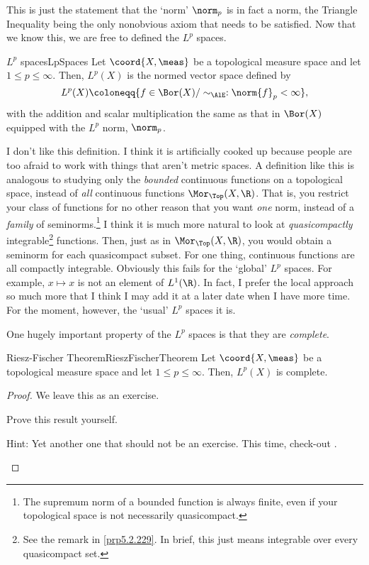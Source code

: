 This is just the statement that the `norm' $\norm _p$ is in fact a norm, the Triangle Inequality being the only nonobvious axiom that needs to be satisfied.  Now that we know this, we are free to defined the $L^p$ spaces.
\begin{dfn}{$L^p$ spaces}{LpSpaces}
Let $\coord{X,\meas}$ be a topological measure space and let $1\leq p\leq \infty$.  Then, $L^p(X)$ is the normed vector space defined by
\begin{equation}
L^p(X)\coloneqq \{ f\in \Bor (X)/\sim _{\AlE}:\norm{f}_p<\infty \} ,
\end{equation}
with the addition and scalar multiplication the same as that in $\Bor (X)$ equipped with the $L^p$ norm, $\norm _p$.
\begin{rmk}
I don't like this definition.  I think it is artificially cooked up because people are too afraid to work with things that aren't metric spaces.  A definition like this is analogous to studying only the \emph{bounded} continuous functions on a topological space, instead of \emph{all} continuous functions $\Mor _{\Top}(X,\R )$.  That is, you restrict your class of functions for no other reason that you want \emph{one} norm, instead of a \emph{family} of seminorms.\footnote{The supremum norm of a bounded function is always finite, even if your topological space is not necessarily quasicompact.}  I think it is much more natural to look at \emph{quasicompactly} integrable\footnote{See the remark in \cref{prp5.2.229}.  In brief, this just means integrable over every quasicompact set.} functions.  Then, just as in $\Mor _{\Top}(X,\R )$, you would obtain a seminorm for each quasicompact subset.  For one thing, continuous functions are all compactly integrable.  Obviously this fails for the `global' $L^p$ spaces.  For example, $x\mapsto x$ is not an element of $L^1(\R )$.  In fact, I prefer the local approach so much more that I think I may add it at a later date when I have more time.  For the moment, however, the `usual' $L^p$ spaces it is.
\end{rmk}
\end{dfn}
One hugely important property of the $L^p$ spaces is that they are \emph{complete}.
\begin{thm}{Riesz-Fischer Theorem}{RieszFischerTheorem}
Let $\coord{X,\meas}$ be a topological measure space and let $1\leq p\leq \infty$.  Then, $L^p(X)$ is complete.
\begin{proof}
We leave this as an exercise.
\begin{exr}[breakable=false]{}{}
Prove this result yourself.
\begin{rmk}
Hint:  Yet another one that should not be an exercise.  This time, check-out \cite[pg.~70]{Stein}.
\end{rmk}
\end{exr}
\end{proof}
\end{thm}
